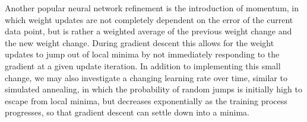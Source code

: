 \documentclass[12pt]{article}  %
\begin{document}
Another popular neural network refinement is the introduction of momentum, in which weight updates are not completely dependent on the error of the current data point, but is rather a weighted average of the previous weight change and the new weight change. During gradient descent this allows for the weight updates to jump out of local minima by not immediately responding to the gradient at a given update iteration. In addition to implementing this small change, we may also investigate a changing learning rate over time, similar to simulated annealing, in which the probability of random jumps is initially high to escape from local minima, but decreases exponentially as the training process progresses, so that gradient descent can settle down into a minima.





\balance
\end{document}
